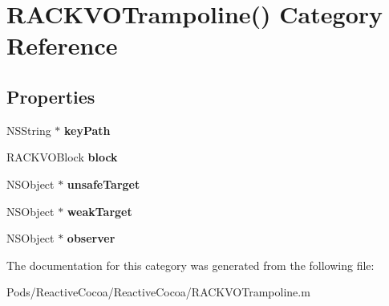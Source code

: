 \hypertarget{category_r_a_c_k_v_o_trampoline_07_08}{}\section{R\+A\+C\+K\+V\+O\+Trampoline() Category Reference}
\label{category_r_a_c_k_v_o_trampoline_07_08}
\subsection*{Properties}
\begin{DoxyCompactItemize}
\item 
\mbox{\label{category_r_a_c_k_v_o_trampoline_07_08_a55b8d4d4eb3bd3e963ea7b456e2f0195}} 
N\+S\+String $\ast$ {\bfseries key\+Path}
\item 
\mbox{\label{category_r_a_c_k_v_o_trampoline_07_08_a41d16b80ad2246c46bb3a6a1bdea261b}} 
R\+A\+C\+K\+V\+O\+Block {\bfseries block}
\item 
\mbox{\label{category_r_a_c_k_v_o_trampoline_07_08_ab8f85c59ae8298dfeca8958918a68de2}} 
N\+S\+Object $\ast$ {\bfseries unsafe\+Target}
\item 
\mbox{\label{category_r_a_c_k_v_o_trampoline_07_08_a8624d3419f1ae31b8eef8780183032f3}} 
N\+S\+Object $\ast$ {\bfseries weak\+Target}
\item 
\mbox{\label{category_r_a_c_k_v_o_trampoline_07_08_a420a0972f712a582764cec719d7f5a91}} 
N\+S\+Object $\ast$ {\bfseries observer}
\end{DoxyCompactItemize}


The documentation for this category was generated from the following file\+:\begin{DoxyCompactItemize}
\item 
Pods/\+Reactive\+Cocoa/\+Reactive\+Cocoa/R\+A\+C\+K\+V\+O\+Trampoline.\+m\end{DoxyCompactItemize}
